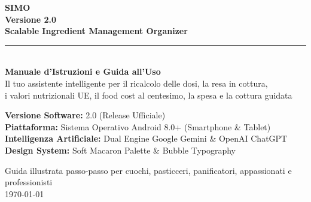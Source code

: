\documentclass[11pt,a4paper]{article}
\begin{document}
\begin{titlepage}
    \centering
    \vspace*{1.2cm}
    
    {\Huge \bfseries \color{simoPink} SIMO}\\[0.2cm]
    {\large \bfseries \color{simoText} Versione 2.0}\\[0.3cm]
    {\large \bfseries \color{simoDarkPink} Scalable Ingredient Management Organizer}\\[0.8cm]
    
    {\color{simoBorder}\rule{0.75\textwidth}{1.5pt}}\\[1.0cm]
    
    {\LARGE \bfseries \color{simoText} Manuale d'Istruzioni e Guida all'Uso}\\[0.4cm]
    {\normalsize \color{simoSubtle} Il tuo assistente intelligente per il ricalcolo delle dosi, la resa in cottura,\\
    i valori nutrizionali UE, il food cost al centesimo, la spesa e la cottura guidata}\\[1.5cm]
    
    \begin{tcolorbox}[
        enhanced,
        colback=white,
        colframe=simoPink,
        arc=6mm,
        width=0.82\textwidth,
        halign=center,
        boxrule=1.5pt,
        drop shadow=simoPink!20
    ]
        \vspace{0.3cm}
        \textbf{\color{simoDarkPink} Versione Software:} 2.0 (Release Ufficiale)\\[0.2cm]
        \textbf{\color{simoText} Piattaforma:} Sistema Operativo Android 8.0+ (Smartphone \& Tablet)\\[0.2cm]
        \textbf{\color{simoSubtle} Intelligenza Artificiale:} Dual Engine Google Gemini \& OpenAI ChatGPT\\[0.2cm]
        \textbf{\color{simoSubtle} Design System:} Soft Macaron Palette \& Bubble Typography\\[0.3cm]
    \end{tcolorbox}
    
    \vfill
    
    {\small \color{simoSubtle} Guida illustrata passo-passo per cuochi, pasticceri, panificatori, appassionati e professionisti\\
    \today}
    \vspace*{0.8cm}
\end{titlepage}
\end{document}
